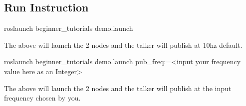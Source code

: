 \subsection*{Run Instruction}


\begin{DoxyCode}
roslaunch beginner\_tutorials demo.launch
\end{DoxyCode}
 The above will launch the 2 nodes and the talker will publish at 10hz default. 
\begin{DoxyCode}
roslaunch beginner\_tutorials demo.launch pub\_freq:=<input your frequency value here as an Integer>
\end{DoxyCode}
 The above will launch the 2 nodes and the talker will publish at the input frequency chosen by you. 